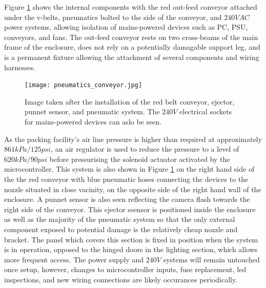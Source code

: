 \documentclass[fleqn,twoside,12pt]{report}
\begin{document}
Figure \ref{fig:pneumatics_conveyor} shows the internal components with the red out-feed conveyor attached under the v-belts, pneumatics bolted to the side of the conveyor, and $240VAC$ power systems, allowing isolation of mains-powered devices such as PC, PSU, conveyors, and fans. The out-feed conveyor rests on two cross-beams of the main frame of the enclosure, does not rely on a potentially damagable support leg, and is a permanent fixture allowing the attachment of several components and wiring harnesses. 


\begin{figure}
	\begin{center}
		\texttt{[image: pneumatics\_conveyor.jpg]}
	\end{center}
	\caption{Image taken after the installation of the red belt conveyor, ejector, punnet sensor, and pneumatic system. The $240V$ electrical sockets for mains-powered devices can aslo be seen.}
	\label{fig:pneumatics_conveyor}
\end{figure} 


As the packing facility's air line pressure is higher than required at approximately $861kPa/125psi$, an air regulator is used to reduce the pressure to a level of $620kPa/90psi$ before pressurising the solenoid actuator activated by the microcontroller. This system is also shown in Figure \ref{fig:pneumatics_conveyor} on the right hand side of the the red conveyor with blue pneumatic hoses connecting the devices to the nozzle situated in close vacinity, on the opposite side of the right hand wall of the enclosure. A punnet sensor is also seen reflecting the camera flash towards the right side of the conveyor. This ejector ssensor is positioned inside the enclosure as well as the majority of the pneumatic system so that the only external component exposed to potential damage is the relatively cheap nozzle and bracket. The panel which covers this section is fixed in position when the system is in operation, opposed to the hinged doors in the lighting section, which allows more frequent access. The power supply and $240V$ systems will remain untouched once setup, however, changes to microcontroller inputs, fuse replacement, led inspections, and new wiring connections are likely occurances periodically.
\end{document}
